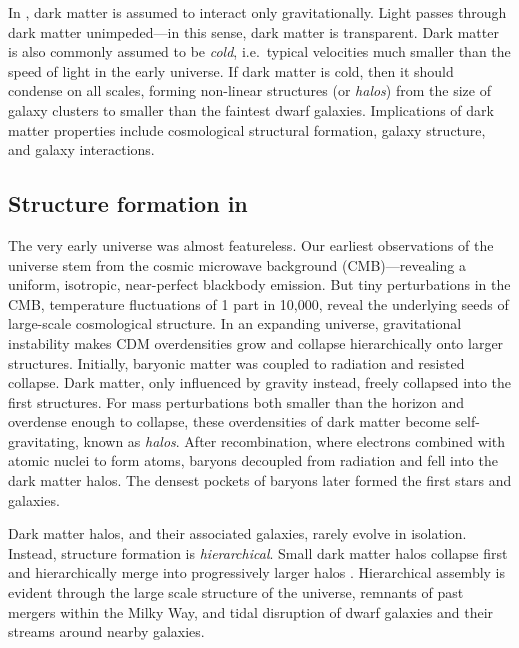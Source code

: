 In \LCDM{}, dark matter is assumed to interact only gravitationally.
Light passes through dark matter unimpeded---in this sense, dark matter
is transparent. Dark matter is also commonly assumed to be \emph{cold},
i.e.~typical velocities much smaller than the speed of light in the
early universe. If dark matter is cold, then it should condense on all
scales, forming non-linear structures (or \emph{halos}) from the size of
galaxy clusters to smaller than the faintest dwarf galaxies.
Implications of dark matter properties include cosmological structural
formation, galaxy structure, and galaxy interactions.

\subsection{\texorpdfstring{Structure formation in
\LCDM{}}{Structure formation in }}\label{structure-formation-in}

The very early universe was almost featureless. Our earliest
observations of the universe stem from the cosmic microwave background
(CMB)---revealing a uniform, isotropic, near-perfect blackbody emission.
But tiny perturbations in the CMB, temperature fluctuations of 1 part in
10,000, reveal the underlying seeds of large-scale cosmological
structure. In an expanding universe, gravitational instability makes CDM
overdensities grow and collapse hierarchically onto larger structures.
Initially, baryonic matter was coupled to radiation and resisted
collapse. Dark matter, only influenced by gravity instead, freely
collapsed into the first structures. For mass perturbations both smaller
than the horizon and overdense enough to collapse, these overdensities
of dark matter become self-gravitating, known as \emph{halos}. After
recombination, where electrons combined with atomic nuclei to form
atoms, baryons decoupled from radiation and fell into the dark matter
halos. The densest pockets of baryons later formed the first stars and
galaxies.

Dark matter halos, and their associated galaxies, rarely evolve in
isolation. Instead, structure formation is \emph{hierarchical}. Small
dark matter halos collapse first and hierarchically merge into
progressively larger halos
\citep[e.g.,][]{blumenthal+1984, white+rees1978, white+frenk1991}.
Hierarchical assembly is evident through the large scale structure of
the universe, remnants of past mergers within the Milky Way, and tidal
disruption of dwarf galaxies and their streams around nearby galaxies.

